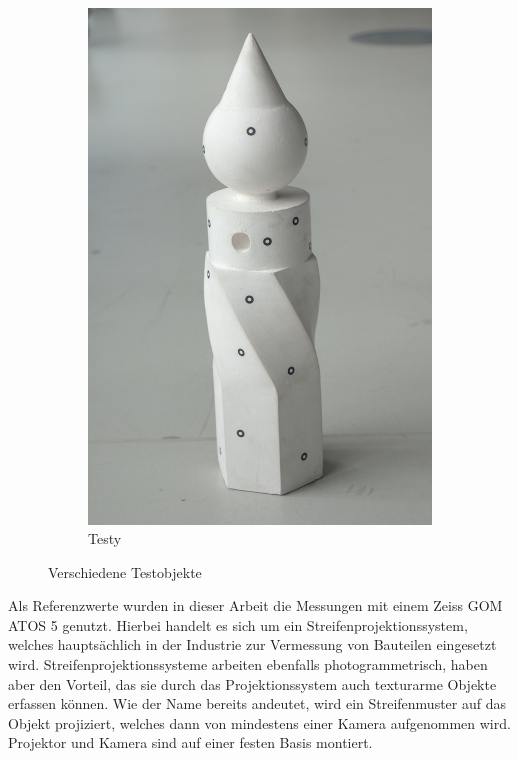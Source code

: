 \documentclass[./00PhotoBox.tex]{subfiles}
\begin{document}
\begin{figure}
\begin{subfigure}{0.32\textwidth}
        \includegraphics[width=1\textwidth]{img/7_versuche/bild_testy.jpg}
        \caption{Testy}
        \label{img:bild_testy}
    \end{subfigure}
    \caption{Verschiedene Testobjekte}
    \label{img:bilder_testobjekte}
\end{figure}

Als Referenzwerte wurden in dieser Arbeit die Messungen mit einem Zeiss GOM ATOS 5 genutzt. Hierbei handelt es sich um ein Streifenprojektionssystem, welches hauptsächlich in der Industrie zur Vermessung von Bauteilen eingesetzt wird. Streifenprojektionssysteme arbeiten ebenfalls photogrammetrisch, haben aber den Vorteil, das sie durch das Projektionssystem auch texturarme Objekte erfassen können. Wie der Name bereits andeutet, wird ein Streifenmuster auf das Objekt projiziert, welches dann von mindestens einer Kamera aufgenommen wird. Projektor und Kamera sind auf einer festen Basis montiert. \citep[vgl.][S. 581f]{luhmann}
\end{document}
